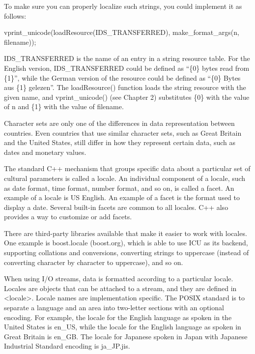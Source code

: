 To make sure you can properly localize such strings, you could implement it as follows:

\begin{cpp}
vprint_unicode(loadResource(IDS_TRANSFERRED), make_format_args(n, filename));
\end{cpp}

IDS\_TRANSFERRED is the name of an entry in a string resource table. For the English version, IDS\_TRANSFERRED could be defined as “\{0\} bytes read from \{1\}”, while the German version of the resource could be defined as “\{0\} Bytes aus \{1\} gelezen”. The loadResource() function loads the string resource with the given name, and vprint\_unicode() (see Chapter 2) substitutes \{0\} with the value of n and \{1\} with the value of filename.


Character sets are only one of the differences in data representation between countries. Even countries that use similar character sets, such as Great Britain and the United States, still differ in how they represent certain data, such as dates and monetary values.

The standard C++ mechanism that groups specific data about a particular set of cultural parameters is called a locale. An individual component of a locale, such as date format, time format, number format, and so on, is called a facet. An example of a locale is US English. An example of a facet is the format used to display a date. Several built-in facets are common to all locales. C++ also provides a way to customize or add facets.

There are third-party libraries available that make it easier to work with locales. One example is boost.locale (boost.org), which is able to use ICU as its backend, supporting collations and conversions, converting strings to uppercase (instead of converting character by character to uppercase), and so on.


When using I/O streams, data is formatted according to a particular locale. Locales are objects that can be attached to a stream, and they are defined in <locale>. Locale names are implementation specific. The POSIX standard is to separate a language and an area into two-letter sections with an optional encoding. For example, the locale for the English language as spoken in the United States is en\_US, while the locale for the English language as spoken in Great Britain is en\_GB. The locale for Japanese spoken in Japan with Japanese Industrial Standard encoding is ja\_JP.jis.

